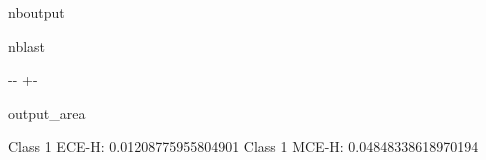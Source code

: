 \documentclass[letterpaper,10pt,english]{sphinxmanual}
\begin{document}
\begin{sphinxuseclass}{nboutput}
\begin{sphinxuseclass}{nblast}
{

\kern-\sphinxverbatimsmallskipamount\kern-\baselineskip
\kern+\FrameHeightAdjust\kern-\fboxrule
\vspace{\nbsphinxcodecellspacing}

\begin{sphinxuseclass}{output_area}
\begin{sphinxuseclass}{}


\begin{sphinxVerbatim}[commandchars=\\\{\}]
Class 1 ECE-H:  0.01208775955804901
Class 1 MCE-H:  0.04848338618970194
\end{sphinxVerbatim}



\end{sphinxuseclass}
\end{sphinxuseclass}
}

\end{sphinxuseclass}
\end{sphinxuseclass}
\end{document}
